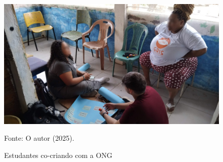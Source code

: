 \begin{figure}[H]
    \caption{Estudantes co-criando com a ONG}
    \centering
    \includegraphics[width=0.6\linewidth]{images/metodologia/ong001.jpeg}
    \label{fig:ong001}
    \vspace{0.2cm}

{\centering Fonte: O autor (2025). \par}
\end{figure}